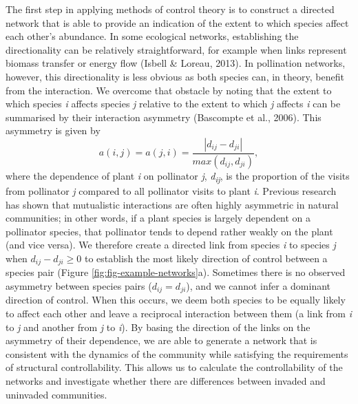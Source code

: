 \documentclass[a4paper]{artikel1}
\theoremstyle{definition}
\theoremstyle{definition}
\theoremstyle{definition}
\theoremstyle{remark}
\begin{document}
The first step in applying methods of control theory is to construct a
directed network that is able to provide an indication of the extent to
which species affect each other's abundance. In some ecological
networks, establishing the directionality can be relatively
straightforward, for example when links represent biomass transfer or
energy flow (Isbell \& Loreau, 2013). In pollination networks, however,
this directionality is less obvious as both species can, in theory,
benefit from the interaction. We overcome that obstacle by noting that
the extent to which species \emph{i} affects species \emph{j} relative
to the extent to which \emph{j} affects \emph{i} can be summarised by
their interaction asymmetry (Bascompte et al., 2006). This asymmetry is
given by
\[a(i,j) = a(j,i) = \frac{\left | d_{ij}-d_{ji} \right |}{max\left ( d_{ij}, d_{ji} \right )},\]
where the dependence of plant \emph{i} on pollinator \emph{j},
\emph{d\textsubscript{ij}}, is the proportion of the visits from
pollinator \emph{j} compared to all pollinator visits to plant \emph{i}.
Previous research has shown that mutualistic interactions are often
highly asymmetric in natural communities; in other words, if a plant
species is largely dependent on a pollinator species, that pollinator
tends to depend rather weakly on the plant (and vice versa). We
therefore create a directed link from species \emph{i} to species
\emph{j} when \(d_{ij}-d_{ji} \geq 0\) to establish the most likely
direction of control between a species pair (Figure
\ref{fig:fig-example-networks}a). Sometimes there is no observed
asymmetry between species pairs (\(d_{ij}=d_{ji}\)), and we cannot infer
a dominant direction of control. When this occurs, we deem both species
to be equally likely to affect each other and leave a reciprocal
interaction between them (a link from \emph{i} to \emph{j} and another
from \emph{j} to \emph{i}). By basing the direction of the links on the
asymmetry of their dependence, we are able to generate a network that is
consistent with the dynamics of the community while satisfying the
requirements of structural controllability. This allows us to calculate
the controllability of the networks and investigate whether there are
differences between invaded and uninvaded communities.
\end{document}
